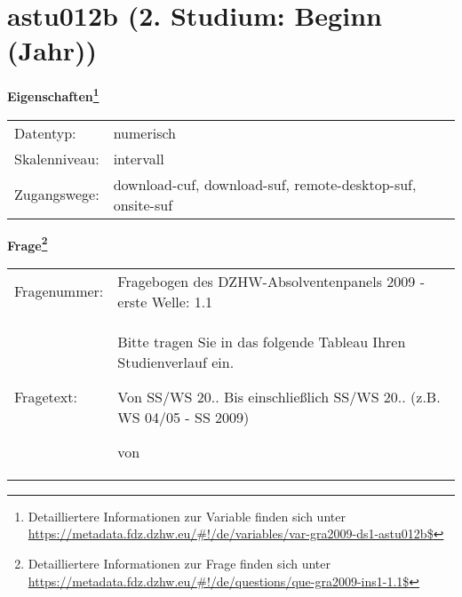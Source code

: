 
    \setcounter{footnote}{0}

    \vspace*{-1.8cm}
	\section{astu012b (2. Studium: Beginn (Jahr))}
	\label{section:astu012b}



    \vspace*{0.5cm}
    \noindent\textbf{Eigenschaften\footnote{Detailliertere Informationen zur Variable finden sich unter
		\url{https://metadata.fdz.dzhw.eu/\#!/de/variables/var-gra2009-ds1-astu012b$}}}\\
	\begin{tabularx}{\hsize}{@{}lX}
	Datentyp: & numerisch \\
	Skalenniveau: & intervall \\
	Zugangswege: &
	  download-cuf, 
	  download-suf, 
	  remote-desktop-suf, 
	  onsite-suf
 \\
    \end{tabularx}



				\vspace*{0.5cm}
                \noindent\textbf{Frage\footnote{Detailliertere Informationen zur Frage finden sich unter
		              \url{https://metadata.fdz.dzhw.eu/\#!/de/questions/que-gra2009-ins1-1.1$}}}\\
				\begin{tabularx}{\hsize}{@{}lX}
					Fragenummer: &
					  Fragebogen des DZHW-Absolventenpanels 2009 - erste Welle:
					  1.1
 \\
					Fragetext: & Bitte tragen Sie in das folgende Tableau Ihren Studienverlauf ein.\par  Von SS/WS 20.. Bis einschließlich SS/WS 20.. (z.B. WS 04/05 - SS 2009)\par  von \\
				\end{tabularx}





